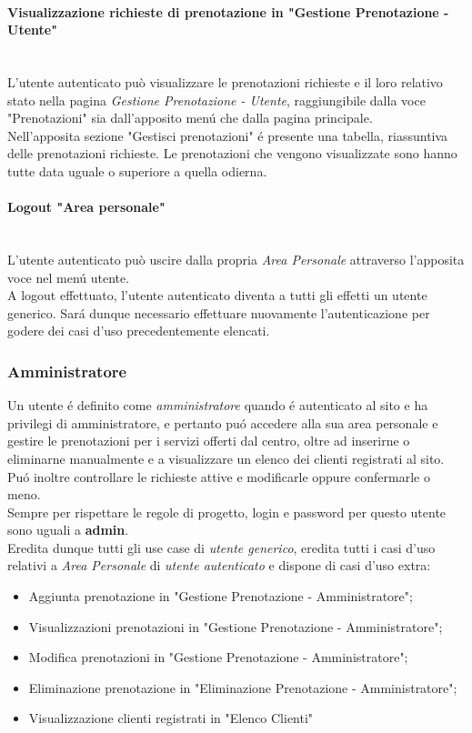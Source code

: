 \documentclass{article}
\begin{document}
\paragraph{Visualizzazione richieste di prenotazione in "Gestione Prenotazione - Utente"}\mbox{}\\
L'utente autenticato può visualizzare le prenotazioni richieste e il loro relativo stato nella pagina \textit{Gestione Prenotazione - Utente}, raggiungibile dalla voce "Prenotazioni" sia dall'apposito menú che dalla pagina principale.\\
Nell'apposita sezione "Gestisci prenotazioni" é presente una tabella, riassuntiva delle prenotazioni richieste. Le prenotazioni che vengono visualizzate sono hanno tutte data uguale o superiore a quella odierna.

\paragraph{Logout "Area personale"}\mbox{}\\
L'utente autenticato può uscire dalla propria \textit{Area Personale} attraverso l'apposita voce nel menú utente.\\
A logout effettuato, l'utente autenticato diventa a tutti gli effetti un utente generico. Sará dunque necessario effettuare nuovamente l'autenticazione per godere dei casi d'uso precedentemente elencati.

\subsubsection{Amministratore}
Un utente é definito come \textit{amministratore} quando é autenticato al sito e ha privilegi di amministratore, e pertanto puó accedere alla sua area personale e gestire le prenotazioni per i servizi offerti dal centro, oltre ad inserirne o eliminarne manualmente e a visualizzare un elenco dei clienti registrati al sito. Puó inoltre controllare le richieste attive e modificarle oppure confermarle o meno.\\
Sempre per rispettare le regole di progetto, login e password per questo utente sono uguali a \textbf{admin}.\\
Eredita dunque tutti gli use case di \textit{utente generico}, eredita tutti i casi d'uso relativi a \textit{Area Personale} di \textit{utente autenticato} e dispone di casi d'uso extra:
\begin{itemize}
	\item Aggiunta prenotazione in "Gestione Prenotazione - Amministratore";
	\item Visualizzazioni prenotazioni in "Gestione Prenotazione - Amministratore";
	\item Modifica prenotazioni in "Gestione Prenotazione - Amministratore";
 	\item Eliminazione prenotazione in "Eliminazione Prenotazione - Amministratore";
 	\item Visualizzazione clienti registrati in "Elenco Clienti"
\end{itemize}
\end{document}
